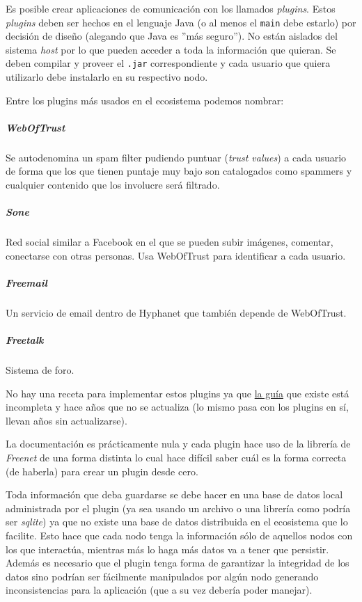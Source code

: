 Es posible crear aplicaciones de comunicación con los llamados \textit{plugins}. Estos \textit{plugins} deben ser hechos en el lenguaje Java (o al menos el \texttt{main} debe estarlo) por decisión de diseño (alegando que Java es ''más seguro''). No están aislados del sistema \textit{host} por lo que pueden acceder a toda la información que quieran. Se deben compilar y proveer el \texttt{.jar} correspondiente y cada usuario que quiera utilizarlo debe instalarlo en su respectivo nodo.

Entre los plugins más usados en el ecosistema podemos nombrar:

\subparagraph{WebOfTrust}\cite{hyphanet-web-of-trust}
Se autodenomina un spam filter pudiendo puntuar (\textit{trust values}) a cada usuario de forma que los que tienen puntaje muy bajo son catalogados como spammers y cualquier contenido que los involucre será filtrado.

\subparagraph{Sone}\cite{hyphanter-sone}
Red social similar a Facebook en el que se pueden subir imágenes, comentar, conectarse con otras personas. Usa WebOfTrust para identificar a cada usuario.

\subparagraph{Freemail}\cite{hyphanet-freemail}
Un servicio de email dentro de Hyphanet que también depende de WebOfTrust.

\subparagraph{Freetalk}\cite{hyphanet-freetalk}
Sistema de foro.

No hay una receta para implementar estos plugins ya que \href{https://github.com/ArneBab/freenet-plugin-bare-guide/blob/master/index.org}{la guía} que existe está incompleta y hace años que no se actualiza (lo mismo pasa con los plugins en sí, llevan años sin actualizarse).

La documentación es prácticamente nula y cada plugin hace uso de la librería de \textit{Freenet} de una forma distinta lo cual hace difícil saber cuál es la forma correcta (de haberla) para crear un plugin desde cero.

Toda información que deba guardarse se debe hacer en una base de datos local administrada por el plugin (ya sea usando un archivo o una librería como podría ser \textit{sqlite}\cite{sqlite}) ya que no existe una base de datos distribuida en el ecosistema que lo facilite. Esto hace que cada nodo tenga la información sólo de aquellos nodos con los que interactúa, mientras más lo haga más datos va a tener que persistir. Además es necesario que el plugin tenga forma de garantizar la integridad de los datos sino podrían ser fácilmente manipulados por algún nodo generando inconsistencias para la aplicación (que a su vez debería poder manejar).

